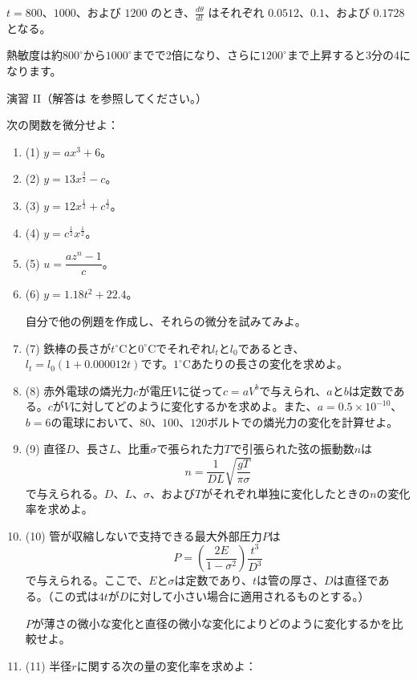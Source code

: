 \documentclass[a4paper,11pt,openany]{ltjsbook}
\begin{document}
$t=800$、$1000$、および $1200$ のとき、$\frac{d\theta}{dt}$ はそれぞれ $0.0512$、$0.1$、および $0.1728$ となる。

熱敏度は約$800^\circ$から$1000^\circ$までで2倍になり、さらに$1200^\circ$まで上昇すると3分の4になります。

演習 II（解答は \pageref{AnsEx:II} を参照してください。）

次の関数を微分せよ：

\begin{enumerate}
\item (1) $y = ax^3 + 6$。
\item (2) $y = 13x^{\frac{3}{2}} - c$。


\item (3) $y = 12x^{\frac{1}{2}} + c^{\frac{1}{2}}$。
\item (4) $y = c^{\frac{1}{2}} x^{\frac{1}{2}}$。


\item (5) $u = \dfrac{az^n - 1}{c}$。
\item (6) $y = 1.18t^2 + 22.4$。

自分で他の例題を作成し、それらの微分を試みてみよ。

\item (7) 鉄棒の長さが$t^\circ\mathrm{C}$と$0^\circ\mathrm{C}$でそれぞれ$l_t$と$l_0$であるとき、$l_t = l_0(1 + 0.000012t)$です。$1^\circ\mathrm{C}$あたりの長さの変化を求めよ。

\item (8) 赤外電球の燐光力$c$が電圧$V$に従って$c = aV^b$で与えられ、$a$と$b$は定数である。$c$が$V$に対してどのように変化するかを求めよ。また、$a = 0.5 \times 10^{-10}$、$b=6$の電球において、$80$、$100$、$120$ボルトでの燐光力の変化を計算せよ。

\item (9) 直径$D$、長さ$L$、比重$\sigma$で張られた力$T$で引張られた弦の振動数$n$は
\[
n = \dfrac{1}{DL} \sqrt{\dfrac{gT}{\pi\sigma}}
\]
で与えられる。$D$、$L$、$\sigma$、および$T$がそれぞれ単独に変化したときの$n$の変化率を求めよ。

\item (10) 管が収縮しないで支持できる最大外部圧力$P$は
\[
  P = \left(\dfrac{2E}{1-\sigma^2}\right) \dfrac{t^3}{D^3}
\]
で与えられる。ここで、$E$と$\sigma$は定数であり、$t$は管の厚さ、$D$は直径である。（この式は$4t$が$D$に対して小さい場合に適用されるものとする。）

$P$が薄さの微小な変化と直径の微小な変化によりどのように変化するかを比較せよ。

\item (11) 半径$r$に関する次の量の変化率を求めよ：


\end{enumerate}
\end{document}
